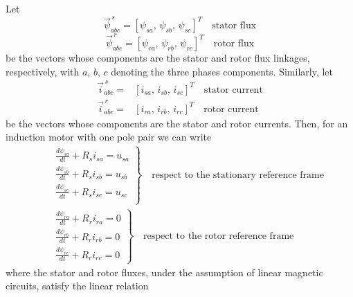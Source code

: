\documentclass[11pt,a4paper]{scrartcl}
\numberwithin{equation}{section}
\theoremstyle{it}
\theoremstyle{definition}
\begin{document}
\begin{onehalfspace}
Let
\begin{equation} \label{im_eq_1}
	\vec{\psi}^{\,s}_{abc} = \left[\psi_{sa},\,\psi_{sb},\,\psi_{sc}\right]^T 
	\quad\text{stator flux}
\end{equation}
\begin{equation} \label{im_eq_2}
	\vec{\psi}^{\,r}_{abc} = \left[\psi_{ra},\,\psi_{rb},\,\psi_{rc}\right]^T 
	\quad\text{rotor flux}
\end{equation}
be the vectors whose components are the stator and rotor flux linkages, 
respectively, with $a$, $b$, $c$ denoting the three phases components. 
Similarly, let
\begin{equation} \label{im_eq_3}
	\begin{aligned}
		\vec{i}^{\,s}_{abc} = & \left[i_{sa},\,i_{sb},\,i_{sc}\right]^T 
		\quad\text{stator current} \\ 
		\vec{i}^{\,r}_{abc} = & \left[i_{ra},\,i_{rb},\,i_{rc}\right]^T 
		\quad\text{rotor current}
	\end{aligned}
\end{equation}
be the vectors whose components are the stator and rotor currents. Then, for an 
induction motor with one pole pair we can write
\begin{equation} \label{im_eq_4}
	\begin{aligned}
		&\left. \begin{aligned}
			& \frac{d\psi_{sa}}{dt} + R_s i_{sa} = u_{sa} \\[6pt]
			& \frac{d\psi_{sb}}{dt} + R_s i_{sb} = u_{sb} \\[6pt]
			& \frac{d\psi_{sc}}{dt} + R_s i_{sc} = u_{sc} \\[6pt]
		\end{aligned}\right\rbrace \quad\text{respect to the stationary 
			reference frame}\\[6pt]
		&\left. \begin{aligned}
			& \frac{d\psi_{ra}}{dt} + R_r i_{ra} = 0 \\[6pt]
			& \frac{d\psi_{rb}}{dt} + R_r i_{rb} = 0 \\[6pt]
			& \frac{d\psi_{rc}}{dt} + R_r i_{rc} = 0 
		\end{aligned} \right\rbrace \quad\text{respect to the rotor reference 
			frame}
	\end{aligned}
\end{equation}
where the stator and rotor fluxes, under the assumption of linear magnetic 
circuits, satisfy the linear relation
\begin{equation}\label{im_eq_5}

\end{equation}
\end{onehalfspace}
\end{document}
